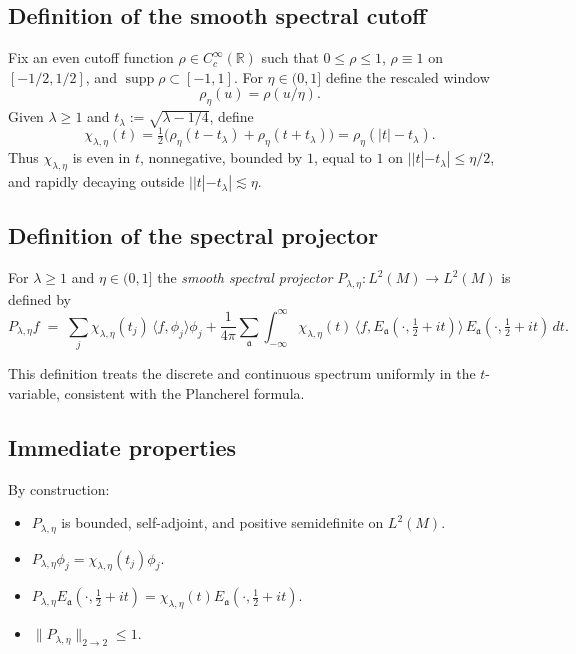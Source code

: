 \subsection*{Definition of the smooth spectral cutoff}

Fix an even cutoff function $\rho\in C_c^\infty(\mathbb{R})$ such that $0\le\rho\le1$, $\rho\equiv1$ on $[-1/2,1/2]$, and $\operatorname{supp}\rho\subset [-1,1]$.  
For $\eta\in(0,1]$ define the rescaled window
\[
  \rho_\eta(u) = \rho(u/\eta).
\]
Given $\lambda\ge1$ and $t_\lambda:=\sqrt{\lambda-1/4}$, define
\[
  \chi_{\lambda,\eta}(t) = \tfrac12\Big( \rho_\eta(t-t_\lambda) + \rho_\eta(t+t_\lambda) \Big) 
  = \rho_\eta(|t|-t_\lambda).
\]
Thus $\chi_{\lambda,\eta}$ is even in $t$, nonnegative, bounded by $1$, equal to $1$ on $||t|-t_\lambda|\le\eta/2$, and rapidly decaying outside $||t|-t_\lambda|\lesssim\eta$.

\subsection*{Definition of the spectral projector}

\begin{definition}\label{def:spectral-projector}
For $\lambda\ge1$ and $\eta\in(0,1]$ the \emph{smooth spectral projector} $P_{\lambda,\eta}:L^2(M)\to L^2(M)$ is defined by
\[
  P_{\lambda,\eta}f \;=\; 
  \sum_{j} \chi_{\lambda,\eta}(t_j)\,\langle f,\phi_j\rangle \phi_j
  + \frac{1}{4\pi}\sum_{\mathfrak{a}} \int_{-\infty}^{\infty} 
    \chi_{\lambda,\eta}(t)\,\langle f,E_{\mathfrak{a}}(\cdot,\tfrac12+it)\rangle\,
    E_{\mathfrak{a}}(\cdot,\tfrac12+it)\,dt.
\]
\end{definition}

\noindent
This definition treats the discrete and continuous spectrum uniformly in the $t$-variable, consistent with the Plancherel formula.  

\subsection*{Immediate properties}

By construction:
\begin{itemize}
  \item $P_{\lambda,\eta}$ is bounded, self-adjoint, and positive semidefinite on $L^2(M)$.
  \item $P_{\lambda,\eta}\phi_j = \chi_{\lambda,\eta}(t_j)\phi_j$.
  \item $P_{\lambda,\eta}E_{\mathfrak{a}}(\cdot,\tfrac12+it) = \chi_{\lambda,\eta}(t)E_{\mathfrak{a}}(\cdot,\tfrac12+it)$.
  \item $\|P_{\lambda,\eta}\|_{2\to2}\le1$.
\end{itemize}

